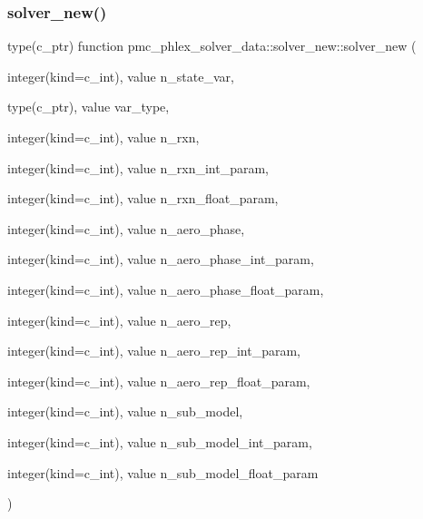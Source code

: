 \subsubsection{\texorpdfstring{solver\+\_\+new()}{solver\_new()}}
{\footnotesize\ttfamily type(c\+\_\+ptr) function pmc\+\_\+phlex\+\_\+solver\+\_\+data\+::solver\+\_\+new\+::solver\+\_\+new (\begin{DoxyParamCaption}\item[{integer(kind=c\+\_\+int), value}]{n\+\_\+state\+\_\+var,  }\item[{type(c\+\_\+ptr), value}]{var\+\_\+type,  }\item[{integer(kind=c\+\_\+int), value}]{n\+\_\+rxn,  }\item[{integer(kind=c\+\_\+int), value}]{n\+\_\+rxn\+\_\+int\+\_\+param,  }\item[{integer(kind=c\+\_\+int), value}]{n\+\_\+rxn\+\_\+float\+\_\+param,  }\item[{integer(kind=c\+\_\+int), value}]{n\+\_\+aero\+\_\+phase,  }\item[{integer(kind=c\+\_\+int), value}]{n\+\_\+aero\+\_\+phase\+\_\+int\+\_\+param,  }\item[{integer(kind=c\+\_\+int), value}]{n\+\_\+aero\+\_\+phase\+\_\+float\+\_\+param,  }\item[{integer(kind=c\+\_\+int), value}]{n\+\_\+aero\+\_\+rep,  }\item[{integer(kind=c\+\_\+int), value}]{n\+\_\+aero\+\_\+rep\+\_\+int\+\_\+param,  }\item[{integer(kind=c\+\_\+int), value}]{n\+\_\+aero\+\_\+rep\+\_\+float\+\_\+param,  }\item[{integer(kind=c\+\_\+int), value}]{n\+\_\+sub\+\_\+model,  }\item[{integer(kind=c\+\_\+int), value}]{n\+\_\+sub\+\_\+model\+\_\+int\+\_\+param,  }\item[{integer(kind=c\+\_\+int), value}]{n\+\_\+sub\+\_\+model\+\_\+float\+\_\+param }\end{DoxyParamCaption})\hspace{0.3cm}{\ttfamily [private]}}


